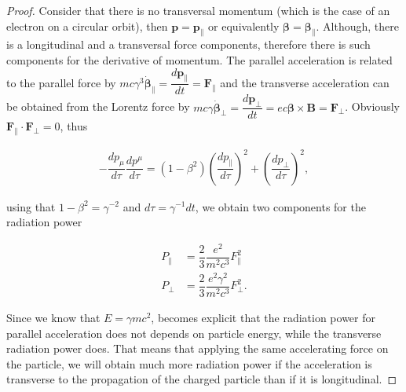 \begin{proof}
Consider that there is no transversal momentum (which is the case of an electron on a circular orbit), then $\boldsymbol{{p}} = \boldsymbol{p}_\parallel$ or equivalently $\boldsymbol{\beta} = \boldsymbol{\beta_\parallel}$. Although, there is a longitudinal and a transversal force components, therefore
 there is such components for the derivative of momentum. The parallel acceleration is related to the parallel force by $mc\gamma^3\boldsymbol{\dot{\beta}}_\parallel = \dfrac{d\mathbf{p}_\parallel}{dt} = \mathbf{F}_\parallel$ and the transverse acceleration can be obtained from the Lorentz force by
 $mc \gamma\boldsymbol{\dot{\beta}}_\perp = \dfrac{d\boldsymbol{p}_{\perp}}{dt} = ec\boldsymbol{{\beta}} \times \mathbf{B} = \mathbf{F}_\perp$. Obviously $\mathbf{F}_\parallel \cdot \mathbf{F}_\perp = 0$, thus

 \begin{align*}
 -\dfrac{d{p_\mu}}{d\tau}\dfrac{dp^\mu}{d\tau} = (1- \beta^2)\left(\dfrac{dp_\parallel}{d\tau}\right)^2 + \left(\dfrac{dp_\perp}{d\tau}\right)^2,
 \end{align*}

 using that $1-\beta^2 = \gamma^{-2}$ and $d\tau = \gamma^{-1}dt$, we obtain two components for the radiation power

\begin{align*}
P_\parallel &=   \dfrac{2}{3}\dfrac{e^2}{m^2c^3}F_\parallel^2 \\
P_\perp &=   \dfrac{2}{3}\dfrac{e^2 \gamma^2}{m^2c^3}F_\perp^2 .
\end{align*}

Since we know that $E = \gamma mc^2$, becomes explicit that the radiation power for parallel acceleration does not depends on particle energy, while the transverse radiation power does. That means that applying the same accelerating force on the particle, we will obtain much more radiation power if the acceleration
is transverse to the propagation of the charged particle than if it is longitudinal.
\end{proof}

